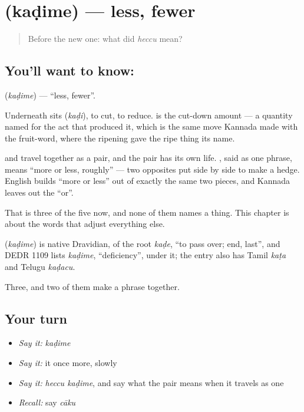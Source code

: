 \section[\texorpdfstring{\kn{ಕಡಿಮೆ} (kaḍime)}{ಕಡಿಮೆ (kaḍime)}]{ (kaḍime) — less, fewer}

\label{lesson:KA-C58-less}



\begin{quote}
Before the new one: what did \emph{heccu} mean?
\end{quote}

\subsection*{You'll want to know: }
\textbf{} (\emph{kaḍime}) — \textquotedblleft{}less, fewer\textquotedblright{}.

Underneath sits  (\emph{kaḍi}), to cut, to reduce.  is the cut-down amount — a quantity named for the act that produced it, which is the same move Kannada made with the fruit-word, where the ripening gave the ripe thing its name.

 and  travel together as a pair, and the pair has its own life.  , said as one phrase, means \textquotedblleft{}more or less, roughly\textquotedblright{} — two opposites put side by side to make a hedge. English builds \textquotedblleft{}more or less\textquotedblright{} out of exactly the same two pieces, and Kannada leaves out the \textquotedblleft{}or\textquotedblright{}.

That is three of the five now, and none of them names a thing. This chapter is about the words that adjust everything else.

\begin{cousinweb}
\textbf{} (\emph{kaḍime}) is native Dravidian, of the root \emph{kaḍe}, \textquotedblleft{}to pass over; end, last\textquotedblright{}, and DEDR 1109 lists \emph{kaḍime}, \textquotedblleft{}deficiency\textquotedblright{}, under it; the entry also has Tamil \emph{kaṭa} and Telugu \emph{kaḍacu}.
\end{cousinweb}

\begin{grammarlens}[title={What you've built}]
Three, and two of them make a phrase together.
\end{grammarlens}

\subsection*{Your turn}
\begin{itemize}
\raggedright
  \item \emph{Say it:} \emph{kaḍime}
  \item \emph{Say it:} it once more, slowly
  \item \emph{Say it:} \emph{heccu kaḍime}, and say what the pair means when it travels as one
  \item \emph{Recall:} say \emph{cāku}
\end{itemize}

